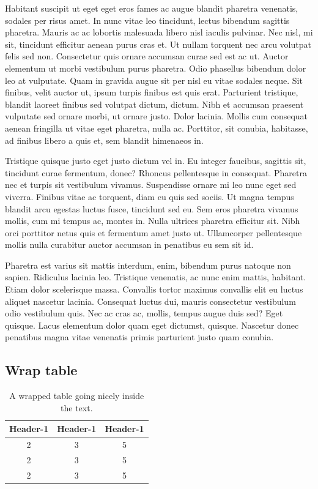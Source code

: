 \documentclass[
  9pt,
  letterpaper,
  DIV=11,
  numbers=noendperiod]{scrartcl}
\begin{document}
Habitant suscipit ut eget eget eros fames ac augue blandit pharetra
venenatis, sodales per risus amet. In nunc vitae leo tincidunt, lectus
bibendum sagittis pharetra. Mauris ac ac lobortis malesuada libero nisl
iaculis pulvinar. Nec nisl, mi sit, tincidunt efficitur aenean purus
cras et. Ut nullam torquent nec arcu volutpat felis sed non. Consectetur
quis ornare accumsan curae sed est ac ut. Auctor elementum ut morbi
vestibulum purus pharetra. Odio phasellus bibendum dolor leo at
vulputate. Quam in gravida augue sit per nisl eu vitae sodales neque.
Sit finibus, velit auctor ut, ipsum turpis finibus est quis erat.
Parturient tristique, blandit laoreet finibus sed volutpat dictum,
dictum. Nibh et accumsan praesent vulputate sed ornare morbi, ut ornare
justo. Dolor lacinia. Mollis cum consequat aenean fringilla ut vitae
eget pharetra, nulla ac. Porttitor, sit conubia, habitasse, ad finibus
libero a quis et, sem blandit himenaeos in.

Tristique quisque justo eget justo dictum vel in. Eu integer faucibus,
sagittis sit, tincidunt curae fermentum, donec? Rhoncus pellentesque in
consequat. Pharetra nec et turpis sit vestibulum vivamus. Suspendisse
ornare mi leo nunc eget sed viverra. Finibus vitae ac torquent, diam eu
quis sed sociis. Ut magna tempus blandit arcu egestas luctus fusce,
tincidunt sed eu. Sem eros pharetra vivamus mollis, cum mi tempus ac,
montes in. Nulla ultrices pharetra efficitur sit. Nibh orci porttitor
netus quis et fermentum amet justo ut. Ullamcorper pellentesque mollis
nulla curabitur auctor accumsan in penatibus eu sem sit id.

Pharetra est varius sit mattis interdum, enim, bibendum purus natoque
non sapien. Ridiculus lacinia leo. Tristique venenatis, ac nunc enim
mattis, habitant. Etiam dolor scelerisque massa. Convallis tortor
maximus convallis elit eu luctus aliquet nascetur lacinia. Consequat
luctus dui, mauris consectetur vestibulum odio vestibulum quis. Nec ac
cras ac, mollis, tempus augue duis sed? Eget quisque. Lacus elementum
dolor quam eget dictumst, quisque. Nascetur donec penatibus magna vitae
venenatis primis parturient justo quam conubia.

\newpage{}

\hypertarget{wrap-table-1}{%
\subsection{Wrap table}\label{wrap-table-1}}

\begin{table}
  \caption{A wrapped table going nicely inside the text.}\label{tbl-wrap}
  \begin{tabular}{ccc}\\\toprule  
  Header-1 & Header-1 & Header-1 \\\midrule
  2 &3 & 5\\  \midrule
  2 &3 & 5\\  \midrule
  2 &3 & 5\\  \bottomrule
  \end{tabular}
\end{table} 
\end{document}
